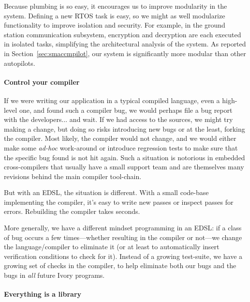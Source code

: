 Because plumbing is so easy, it encourages us to improve modularity in the
system.  Defining a new RTOS task is easy, so we might as well modularize
functionality to improve isolation and security.  For example, in the ground
station communication subsystem, encryption and decryption are each executed in
isolated tasks, simplifying the architectural analysis of the system.  As
reported in Section~\ref{sec:smaccmpilot}, our system is significantly more
modular than other autopilots.

\paragraph{Control your compiler}
If we were writing our application in a typical compiled language, even a
high-level one, and found such a compiler bug, we would perhaps file a bug
report with the developers... and wait.  If we had access to the sources, we
might try making a change, but doing so risks introducing new bugs or at the
least, forking the compiler.  Most likely, the compiler would not change, and we
would either make some \emph{ad-hoc} work-around or introduce regression tests
to make sure that the specific bug found is not hit again.  Such a situation is
notorious in embedded cross-compilers that usually have a small support team and
are themselves many revisions behind the main compiler tool-chain.

But with an EDSL, the situation is different.  With a small code-base
implementing the compiler, it’s easy to write new passes or inspect passes for
errors.  Rebuilding the compiler takes seconds.

More generally, we have a different mindset programming in an EDSL: if a class
of bug occurs a few times---whether resulting in the compiler or not---we change
the language/compiler to eliminate it (or at least to automatically insert
verification conditions to check for it).  Instead of a growing test-suite, we
have a growing set of checks in the compiler, to help eliminate both our bugs
and the bugs in \emph{all} future Ivory programs.

\paragraph{Everything is a library}

